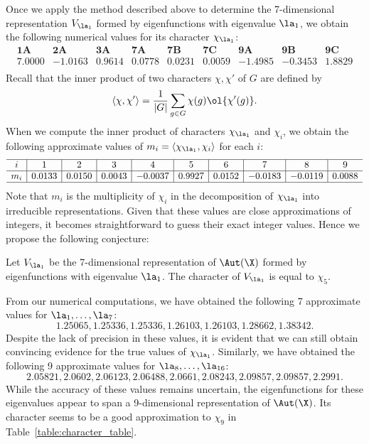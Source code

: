 Once we apply the method described above to determine the 7-dimensional representation $V_{\la_1}$ formed by eigenfunctions with eigenvalue $\la_1$, we obtain the following numerical values for its character $\chi_{\la_1}$:
\[
\begin{array}{c|c|c|c|c|c|c|c|c}
\textbf{1A} & \textbf{2A} & \textbf{3A} & \textbf{7A} & \textbf{7B} & \textbf{7C} & \textbf{9A} & \textbf{9B} & \textbf{9C} \\
\hline
7.0000 & -1.0163 & 0.9614 & 0.0778 & 0.0231 & 0.0059 & -1.4985 & -0.3453 & 1.8829 \\
\end{array}
\]
Recall that the inner product of two characters $\chi, \chi'$ of $G$ are defined by
\[ \langle \chi, \chi' \rangle = \frac{1}{|G|} \sum_{g \in G} \chi(g) \ol{\chi'(g)}. \]
When we compute the inner product of characters $\chi_{\la_1}$ and $\chi_i$, we obtain the following approximate values of $m_i = \langle \chi_{\la_1}, \chi_i \rangle$ for each $i$:
\[
\begin{array}{c|c|c|c|c|c|c|c|c|c}
\hline
i & 1 & 2 & 3 & 4 & 5 & 6 & 7 & 8 & 9 \\
\hline
m_i & 0.0133 & 0.0150 & 0.0043 & -0.0037 & 0.9927 & 0.0152 & -0.0183 & -0.0119 & 0.0088 \\
\hline
\end{array}
\]
Note that $m_i$ is the multiplicity of $\chi_i$ in the decomposition of $\chi_{\la_1}$ into irreducible representations.
Given that these values are close approximations of integers, it becomes straightforward to guess their exact integer values.
Hence we propose the following conjecture:
\begin{conjecture}\label{conj:rep7}
Let $V_{\la_1}$ be the 7-dimensional representation of $\Aut(\X)$ formed by eigenfunctions with eigenvalue $\la_1$. 
The character of $V_{\la_1}$ is equal to $\chi_5$.
\end{conjecture}

From our numerical computations, we have obtained the following 7 approximate values for $\la_1, \dots, \la_7$:
\[1.25065,1.25336,1.25336,1.26103,1.26103,1.28662,1.38342.
\]
Despite the lack of precision in these values, it is evident that we can still obtain convincing evidence for the true values of $\chi_{\la_1}$.
Similarly, we have obtained the following 9 approximate values for $\la_8, \dots, \la_{16}$:
\[
2.05821,2.0602,2.06123,2.06488,2.0661,2.08243,2.09857,2.09857,2.2991.
\]
While the accuracy of these values remains uncertain, the eigenfunctions for these eigenvalues appear to span a 9-dimensional representation of $\Aut(\X)$.
Its character seems to be a good approximation to $\chi_9$ in Table~\ref{table:character_table}.

